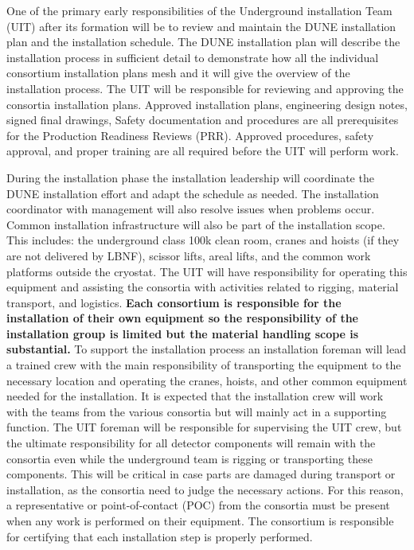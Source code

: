 One of the primary early responsibilities of the Underground
installation Team (UIT) after its formation will be to review and
maintain the DUNE installation plan and the installation schedule. The
DUNE installation plan will describe the installation process in
sufficient detail to demonstrate how all the individual consortium
installation plans mesh and it will give the overview of the
installation process. The UIT will be responsible for reviewing and
approving the consortia installation plans. Approved installation
plans, engineering design notes, signed final drawings, Safety
documentation and procedures are all prerequisites for the Production
Readiness Reviews (PRR). Approved procedures, safety approval, and
proper training are all required before the UIT will perform work.
  
During the installation phase the installation leadership will
coordinate the DUNE installation effort and adapt the schedule as
needed. The installation coordinator with management will also resolve
issues when problems occur. Common installation infrastructure will
also be part of the installation scope. This includes: the underground
class 100k clean room, cranes and hoists (if they are not delivered by
LBNF), scissor lifts, areal lifts, and the common work platforms
outside the cryostat. The UIT will have responsibility for operating
this equipment and assisting the consortia with activities related to
rigging, material transport, and logistics. {\bf Each consortium is
  responsible for the installation of their own equipment so the
  responsibility of the installation group is limited but the material
  handling scope is substantial.} To support the installation process
an installation foreman will lead a trained crew with the main
responsibility of transporting the equipment to the necessary location
and operating the cranes, hoists, and other common equipment needed
for the installation. It is expected that the installation crew will
work with the teams from the various consortia but will mainly act in
a supporting function. The UIT foreman will be responsible for
supervising the UIT crew, but the ultimate responsibility for all
detector components will remain with the consortia even while the
underground team is rigging or transporting these components.  This
will be critical in case parts are damaged during transport or
installation, as the consortia need to judge the necessary
actions. For this reason, a representative or point-of-contact (POC)
from the consortia must be present when any work is performed on their
equipment. The consortium is responsible for certifying that each
installation step is properly performed.

